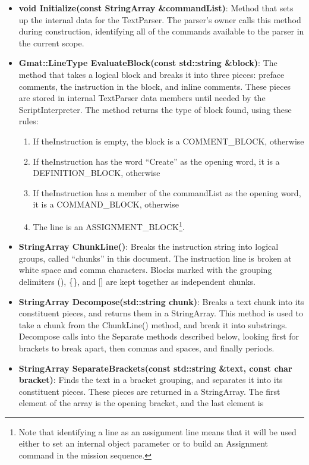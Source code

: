 \begin{itemize}
\item \textbf{void Initialize(const StringArray \&commandList)}: Method that sets up the internal
data for the TextParser.  The parser's owner calls this method during construction, identifying all
of the commands available to the parser in the current scope.
\item \textbf{Gmat::LineType EvaluateBlock(const std::string \&block)}: The method that takes a
logical block and breaks it into three pieces: preface comments, the instruction in the block, and
inline comments.  These pieces are stored in internal TextParser data members until needed by the
ScriptInterpreter.  The method returns the type of block found, using these rules:
\begin{enumerate}
\item If theInstruction is empty, the block is a COMMENT\_BLOCK, otherwise
\item If theInstruction has the word ``Create'' as the opening word, it is a DEFINITION\_BLOCK,
otherwise
\item If theInstruction has a member of the commandList as the opening word, it is a COMMAND\_BLOCK,
otherwise
\item The line is an ASSIGNMENT\_BLOCK\footnote{Note that identifying a line as an assignment line
means that it will be used either to set an internal object parameter or to build an Assignment
command in the mission sequence.}.
\end{enumerate}
\item \textbf{StringArray ChunkLine()}: Breaks the instruction string into logical groups, called
``chunks'' in this document.  The instruction line is broken at white space and comma characters.
Blocks marked with the grouping delimiters (), \{\}, and [] are kept together as independent chunks.
\item \textbf{StringArray Decompose(std::string chunk)}: Breaks a text chunk into its constituent
pieces, and returns them in a StringArray.  This method is used to take a chunk from the
ChunkLine() method, and break it into substrings.  Decompose calls into the Separate methods
described below, looking first for brackets to break apart, then commas and spaces, and finally
periods.
\item \textbf{StringArray SeparateBrackets(const std::string \&text, const char bracket)}: Finds the
text in a bracket grouping, and separates it into its constituent pieces.  These pieces are returned
in a StringArray.  The first element of the array is the opening bracket, and the last element is

\end{itemize}

